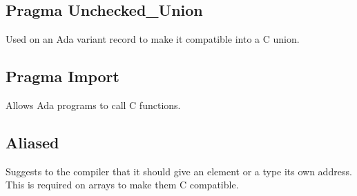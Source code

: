 \subsection{Pragma Unchecked_Union}
Used on an Ada variant record to make it compatible into a C union.
\subsection{Pragma Import}
Allows Ada programs to call C functions.
\subsection{Aliased}
Suggests to the compiler that it should give an element or a type its own address. This is required on arrays to make them C compatible.
